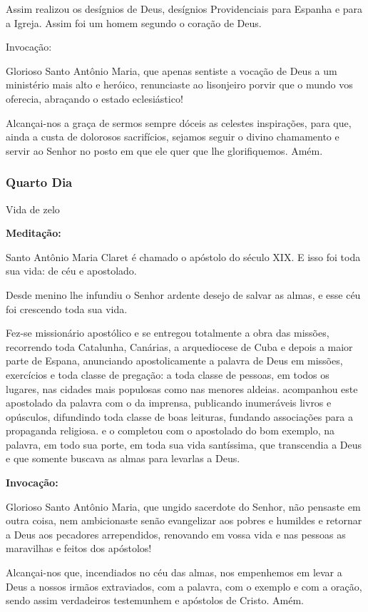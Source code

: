 \documentclass[a4paper,14pt]{extarticle} \usepackage[utf8]{inputenc}
\begin{document}
Assim realizou os desígnios de Deus, desígnios Providenciais para Espanha e para a Igreja. Assim foi um homem segundo o coração de Deus.

Invocação:

Glorioso Santo Antônio Maria, que apenas sentiste a vocação de Deus a um ministério mais alto e heróico, renunciaste ao lisonjeiro porvir que o mundo vos oferecia, abraçando o estado eclesiástico!

Alcançai-nos a graça de sermos sempre dóceis as celestes inspirações, para que, ainda a custa de dolorosos sacrifícios, sejamos seguir o divino chamamento e servir ao Senhor no posto em que ele quer que lhe glorifiquemos. Amém.

\subsubsection{Quarto Dia}
Vida de zelo

\textbf{Meditação:}

Santo Antônio Maria Claret é chamado o apóstolo do século XIX. E isso foi toda sua vida: de céu e apostolado.

Desde menino lhe infundiu o Senhor ardente desejo de salvar as almas, e esse céu foi crescendo toda sua vida.

Fez-se missionário apostólico e se entregou totalmente a obra das missões, recorrendo toda Catalunha, Canárias, a arquediocese de Cuba e depois a maior parte de Espana, anunciando apostolicamente a palavra de Deus em missões, exercícios e toda classe de pregação: a toda classe de pessoas, em todos os lugares, nas cidades mais populosas como nas menores aldeias. acompanhou este apostolado da palavra com o da imprensa, publicando inumeráveis livros e opúsculos, difundindo toda classe de boas leituras, fundando associações para a propaganda religiosa. e o completou com o apostolado do bom exemplo, na palavra, em todo sua porte, em toda sua vida santíssima, que transcendia a Deus e que somente buscava as almas para levarlas a Deus.

\textbf{Invocação:}

Glorioso Santo Antônio Maria, que ungido sacerdote do Senhor, não pensaste em outra coisa, nem ambicionaste senão evangelizar aos pobres e humildes e retornar a Deus aos pecadores arrependidos, renovando em vossa vida e nas pessoas as maravilhas e feitos dos apóstolos!

Alcançai-nos que, incendiados no céu das almas, nos empenhemos em levar a Deus a nossos irmãos extraviados, com a palavra, com o exemplo e com a oração, sendo assim verdadeiros testemunhem e apóstolos de Cristo. Amém.
\end{document}
